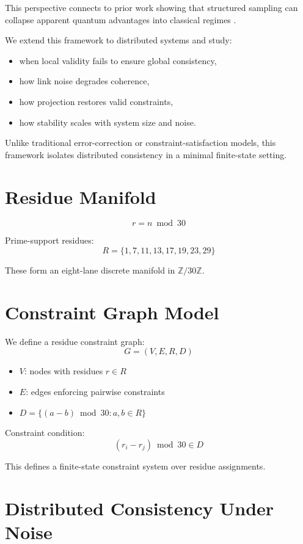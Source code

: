 \documentclass[11pt]{article}
\begin{document}
This perspective connects to prior work showing that structured sampling can collapse apparent quantum advantages into classical regimes \cite{tang2019}.

We extend this framework to distributed systems and study:

\begin{itemize}[leftmargin=*]
\item when local validity fails to ensure global consistency,
\item how link noise degrades coherence,
\item how projection restores valid constraints,
\item how stability scales with system size and noise.
\end{itemize}

Unlike traditional error-correction or constraint-satisfaction models, this framework isolates distributed consistency in a minimal finite-state setting.

\section{Residue Manifold}

\[
r = n \bmod 30
\]

Prime-support residues:
\[
R = \{1,7,11,13,17,19,23,29\}
\]

These form an eight-lane discrete manifold in $\mathbb{Z}/30\mathbb{Z}$.

\section{Constraint Graph Model}

We define a residue constraint graph:
\[
G = (V, E, R, D)
\]

\begin{itemize}[leftmargin=*]
\item $V$: nodes with residues $r \in R$
\item $E$: edges enforcing pairwise constraints
\item $D = \{(a-b)\bmod 30 : a,b \in R\}$
\end{itemize}

Constraint condition:
\[
(r_i - r_j) \bmod 30 \in D
\]

This defines a finite-state constraint system over residue assignments.

\section{Distributed Consistency Under Noise}
\end{document}
